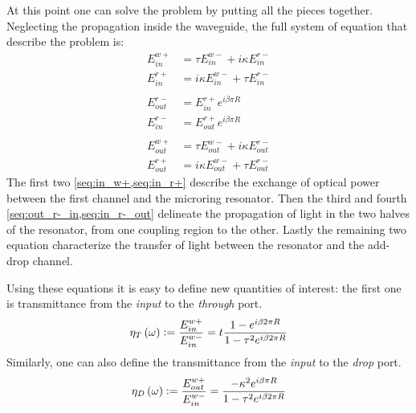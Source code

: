 At this point one can solve the problem by putting all the pieces together.
Neglecting the propagation inside the waveguide, the full system of equation that describe the problem is:
\begin{subequations}
\begin{align}
E^{w+}_{in}	&= \tau 		 E^{w-}_{in} + i\kappa	E^{r-}_{in} \label{seq:in_w+}\\
E^{r+}_{in}	&= i\kappa	 E^{w-}_{in} + \tau 		E^{r-}_{in} \label{seq:in_r+}\\
\nonumber\\
E^{r-}_{out}	&= E^{r+}_{in}		e^{i\beta \pi R } \label{seq:out_r-_in}\\
E^{r-}_{in}	&= E^{r+}_{out}	e^{i\beta \pi R } \label{seq:in_r-_out}\\
\nonumber\\
E^{w+}_{out}	&= \tau 		 E^{w-}_{out} + i\kappa	E^{r-}_{out} \label{seq:out_w+}\\
E^{r+}_{out}	&= i\kappa	 E^{w-}_{out} + \tau 		E^{r-}_{out} \label{seq:out_r+}
\end{align}
\label{eq:ADF_equations}
\end{subequations}
The first two \cref{seq:in_w+,seq:in_r+} describe the exchange of optical power between the first channel and the microring resonator.
Then the third and fourth \cref{seq:out_r-_in,seq:in_r-_out} delineate the propagation of light in the two halves of the resonator, from one coupling region to the other.
Lastly the remaining two equation characterize the transfer of light between the resonator and the add-drop channel.

Using these equations it is easy to define new quantities of interest: the first one is transmittance from the \textit{input} to the \textit{through} port.
\begin{equation}
\eta_T\left(\omega\right) \vcentcolon= \dfrac{E^{w+}_{in}}{E^{w-}_{in}}
	= t\dfrac{1-e^{i\beta 2\pi R}}{1-\tau^2e^{i\beta 2\pi R}}
\end{equation}
Similarly, one can also define the transmittance from the \textit{input} to the \textit{drop} port.
\begin{equation}
\eta_D\left(\omega\right) \vcentcolon= \dfrac{E^{w+}_{out}}{E^{w-}_{in}}
	= \dfrac{-\kappa^2e^{i\beta\pi R}}{1-\tau^2e^{i\beta 2\pi R}}
\end{equation}

